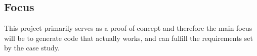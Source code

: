 





	\subsection{Focus} %
	\label{sub:focus}
		This project primarily serves as a proof-of-concept and therefore the main focus will be to generate code that actually works, and can fulfill the requirements set by the case study. 

